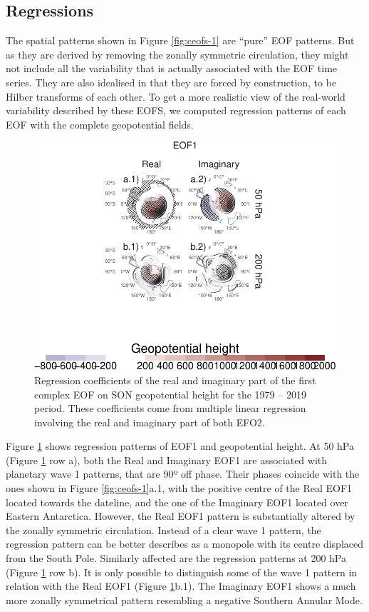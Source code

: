 \documentclass[smallextended]{svjour3}       %
\begin{document}
\hypertarget{regressions}{%
\subsection{Regressions}\label{regressions}}

The spatial patterns shown in Figure \ref{fig:ceofs-1} are ``pure'' EOF patterns. But as they are derived by removing the zonally symmetric circulation, they might not include all the variability that is actually associated with the EOF time series. They are also idealised in that they are forced by construction, to be Hilber transforms of each other. To get a more realistic view of the real-world variability described by these EOFS, we computed regression patterns of each EOF with the complete geopotential fields.



\begin{figure}
\centering
\includegraphics{../figures/eof1-regr-gh-1.pdf}
\caption{\label{fig:eof1-regr-gh}Regression coefficients of the real and imaginary part of the first complex EOF on SON geopotential height for the 1979 -- 2019 period. These coefficients come from multiple linear regression involving the real and imaginary part of both EFO2.}
\end{figure}

Figure \ref{fig:eof1-regr-gh} shows regression patterns of EOF1 and geopotential height. At 50 hPa (Figure \ref{fig:eof1-regr-gh} row a), both the Real and Imaginary EOF1 are associated with planetary wave 1 patterns, that are 90º off phase. Their phases coincide with the ones shown in Figure \ref{fig:ceofs-1}a.1, with the positive centre of the Real EOF1 located towards the dateline, and the one of the Imaginary EOF1 located over Eastern Antarctica. However, the Real EOF1 pattern is substantially altered by the zonally symmetric circulation. Instead of a clear wave 1 pattern, the regression pattern can be better describes as a monopole with its centre displaced from the South Pole.
Similarly affected are the regression patterns at 200 hPa (Figure \ref{fig:eof1-regr-gh} row b). It is only possible to distinguish some of the wave 1 pattern in relation with the Real EOF1 (Figure \ref{fig:eof1-regr-gh}b.1). The Imaginary EOF1 shows a much more zonally symmetrical pattern resembling a negative Southern Annular Mode.
\end{document}
